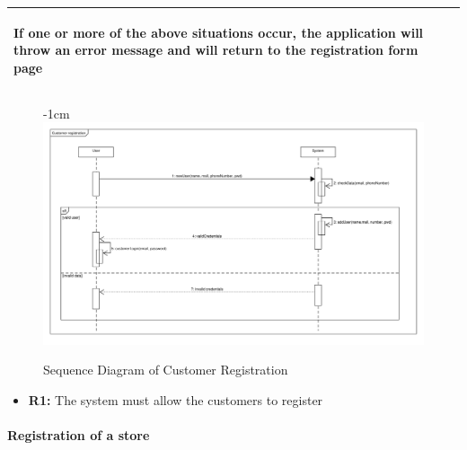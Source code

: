 \documentclass{article}
\begin{document}
\begin{center}
\begin{adjustwidth}{-2.8cm}{}
\begin{tabular}[h!]{|m{7.5em}|m{36em}|}
\begin{enumerate}
						\end{enumerate}
						If one or more of the above situations occur, the application will throw an error message and will return to the registration form page\\		
						\hline
						
					\end{tabular}

					
					

					\begin{figure}[!h]
						\begin{adjustwidth} {-1cm}{}
							\includegraphics[scale=0.36]{SD/1_customerRegistration.pdf}
						\end{adjustwidth}
						\caption{Sequence Diagram of Customer Registration}
					\end{figure}
					\end{adjustwidth}
				
					\begin{itemize}
					\medskip
					{\bfseries Required functional requirements: }
					\item {\bfseries R1: } The system must allow the customers to register


					\end{itemize}
				\end{center}
			\bigskip
			\paragraph{Registration of a store}
			
\end{document}
